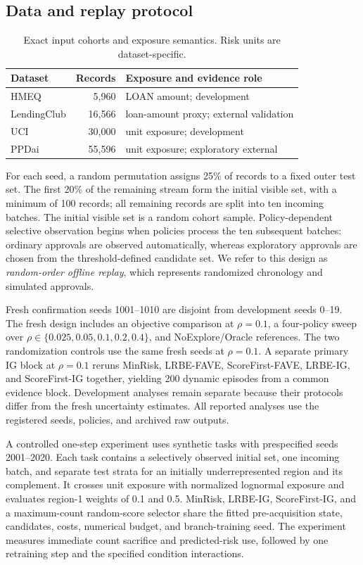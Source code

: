 \subsection{Data and replay protocol}
\begin{table}[t]
\caption{Exact input cohorts and exposure semantics. Risk units are dataset-specific.}
\label{tab:datasets}
\centering
\begin{tabular}{lrl}
\toprule
Dataset & Records & Exposure and evidence role\\
\midrule
HMEQ & 5,960 & LOAN amount; development\\
LendingClub & 16,566 & loan-amount proxy; external validation\\
UCI & 30,000 & unit exposure; development\\
PPDai & 55,596 & unit exposure; exploratory external\\
\bottomrule
\end{tabular}
\end{table}
For each seed, a random permutation assigns 25\% of records to a fixed outer test set. The first 20\% of the remaining stream form the initial visible set, with a minimum of 100 records; all remaining records are split into ten incoming batches. The initial visible set is a random cohort sample. Policy-dependent selective observation begins when policies process the ten subsequent batches: ordinary approvals are observed automatically, whereas exploratory approvals are chosen from the threshold-defined candidate set. We refer to this design as \emph{random-order offline replay}, which represents randomized chronology and simulated approvals.

Fresh confirmation seeds 1001--1010 are disjoint from development seeds 0--19. The fresh design includes an objective comparison at $\rho=0.1$, a four-policy sweep over $\rho\in\{0.025,0.05,0.1,0.2,0.4\}$, and NoExplore/Oracle references. The two randomization controls use the same fresh seeds at $\rho=0.1$. A separate primary IG block at $\rho=0.1$ reruns MinRisk, LRBE-FAVE, ScoreFirst-FAVE, LRBE-IG, and ScoreFirst-IG together, yielding 200 dynamic episodes from a common evidence block. Development analyses remain separate because their protocols differ from the fresh uncertainty estimates. All reported analyses use the registered seeds, policies, and archived raw outputs.

A controlled one-step experiment uses synthetic tasks with prespecified seeds 2001--2020. Each task contains a selectively observed initial set, one incoming batch, and separate test strata for an initially underrepresented region and its complement. It crosses unit exposure with normalized lognormal exposure and evaluates region-1 weights of 0.1 and 0.5. MinRisk, LRBE-IG, ScoreFirst-IG, and a maximum-count random-score selector share the fitted pre-acquisition state, candidates, costs, numerical budget, and branch-training seed. The experiment measures immediate count sacrifice and predicted-risk use, followed by one retraining step and the specified condition interactions.

